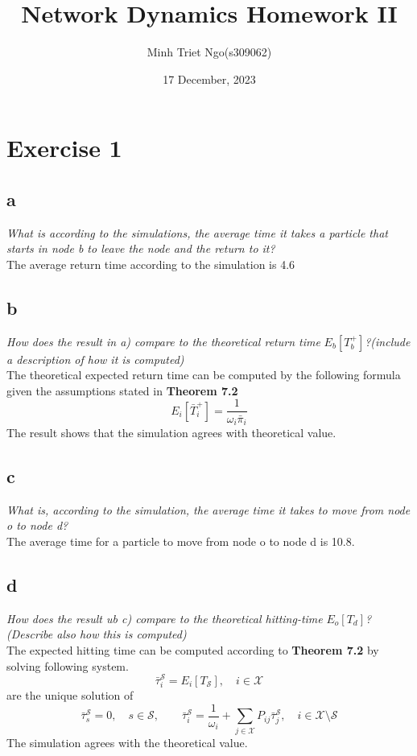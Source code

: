 \documentclass{article}
\title{Network Dynamics Homework II}
\author{ Minh Triet Ngo(s309062)}
\begin{document}
\date{17 December, 2023}
\maketitle

\section{Exercise 1}
\subsection{a}
\textit{What is according to the simulations, the average time it takes a particle that
starts in node b to leave the node and the return to it?} \\
The average return time according to the simulation is 4.6
\subsection{b}
\textit{How does the result in a) compare to the theoretical return time} $E_b[T_b^+]$\textit{?(include a description of how it is computed)} \\
The theoretical expected return time can be computed by the following formula given the assumptions stated in \textbf{Theorem 7.2}\\
$$E_i[\bar{T}_i^+] = \frac{1}{\omega_i\bar{\pi}_i}$$ 
The result shows that the simulation agrees with theoretical value.
\subsection{c}
\textit{What is, according to the simulation, the average time it takes to move from node o to node d?}\\
The average time for a particle to move from node o to node d is 10.8.
\subsection{d}
\textit{How does the result ub c) compare to the theoretical hitting-time} $E_o[T_d]$\textit{? (Describe also how this is computed)}\\
The expected hitting time can be computed according to \textbf{Theorem 7.2} by solving following system.
$$\bar{\tau}_i^{\mathcal{S}} = E_i[T_{\mathcal{S}}], \quad i \in \mathcal{X} $$
are the unique solution of
$$\bar{\tau}_s^{\mathcal{S}} = 0, \quad s \in \mathcal{S}, \quad \quad \bar{\tau}_i^{\mathcal{S}} = \frac{1}{\omega_i} + \sum_{j \in \mathcal{X} }P_{ij}\bar{\tau}_j^{\mathcal{S}}, \quad i \in \mathcal{X} \setminus \mathcal{S}$$
The simulation agrees with the theoretical value.
\end{document}
